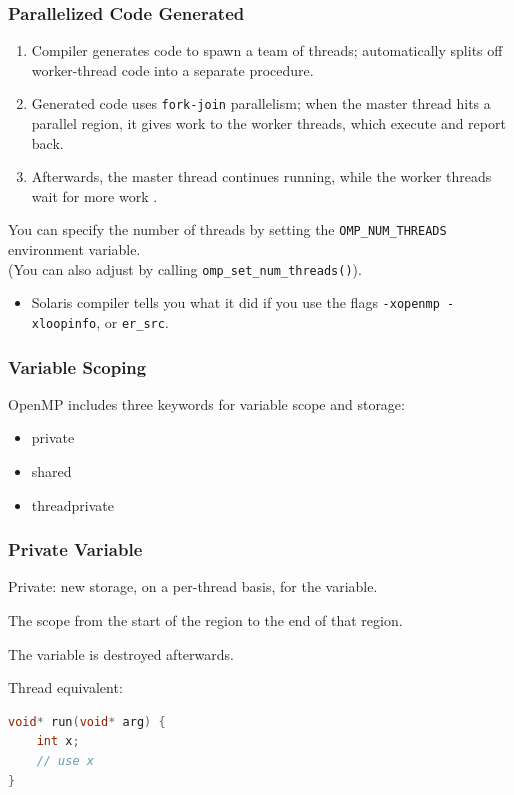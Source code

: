 \begin{frame}[containsverbatim]
  \frametitle{Parallelized Code Generated}

  \begin{enumerate}
    \item Compiler generates code to spawn a \alert{team}
of threads; automatically splits off worker-thread code into a
separate procedure.
    \item Generated code uses {\tt fork-join} parallelism; when the
master thread hits a parallel region, it gives work to the worker
threads, which execute and report back.
    \item Afterwards, the master thread
continues running, while the worker threads wait for more work .
  \end{enumerate}



You can specify the number of threads by setting the
\verb+OMP_NUM_THREADS+ environment variable. \\

(You can also adjust by calling 
\verb+omp_set_num_threads()+).

\begin{itemize}
  \item Solaris compiler tells you what it did if you use the flags \verb+-xopenmp -xloopinfo+, or \verb+er_src+.
\end{itemize}

  


\end{frame}

\begin{frame}[fragile]
  \frametitle{Variable Scoping}
OpenMP includes three keywords for variable scope and storage:
\begin{itemize}
        \item private
        \item shared
        \item threadprivate
\end{itemize}


\end{frame}


\begin{frame}[fragile]
\frametitle{Private Variable}


Private: new storage, on a per-thread basis, for the variable.

The scope from the start of the region to the end of that region.

The variable is destroyed afterwards.

Thread equivalent:

  \begin{lstlisting}[language=C]
void* run(void* arg) {
    int x;
    // use x
}
  \end{lstlisting}

\end{frame}


